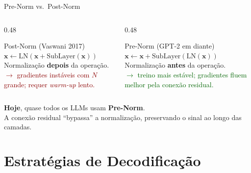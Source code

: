 \documentclass[aspectratio=169, xcolor=dvipsnames]{beamer}
\begin{document}
  \begin{frame}{Pre-Norm vs.\ Post-Norm}
    \begin{columns}[T]
      \begin{column}{0.48\textwidth}
        \begin{block}{Post-Norm (Vaswani 2017)}
          $\mathbf{x} \leftarrow \text{LN}(\mathbf{x} + \text{SubLayer}(\mathbf{x}))$\\[0.3em]
          Normalização \textbf{depois} da operação.\\
          \textcolor{DarkRed}{$\to$ gradientes instáveis com $N$ grande; requer \textit{warm-up} lento.}
        \end{block}
      \end{column}
      \begin{column}{0.48\textwidth}
        \begin{block}{Pre-Norm (GPT-2 em diante)}
          $\mathbf{x} \leftarrow \mathbf{x} + \text{SubLayer}(\text{LN}(\mathbf{x}))$\\[0.3em]
          Normalização \textbf{antes} da operação.\\
          \textcolor{DarkGreen}{$\to$ treino mais estável; gradientes fluem melhor pela conexão residual.}
        \end{block}
      \end{column}
    \end{columns}
    \vspace{0.5em}
    \begin{center}
      \textbf{Hoje}, quase todos os LLMs usam \textbf{Pre-Norm}.\\
      A conexão residual ``bypassa'' a normalização, preservando o sinal ao longo das camadas.
    \end{center}
  \end{frame}

  \section{Estratégias de Decodificação}
\end{document}
